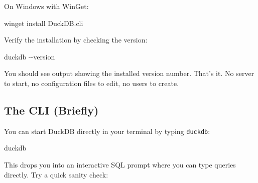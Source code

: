 \documentclass[
  letterpaper,
  DIV=11,
  numbers=noendperiod]{scrreprt}
\newenvironment{Shaded}{\begin{snugshade}}{\end{snugshade}}
\newcommand{\AttributeTok}[1]{\textcolor[rgb]{0.40,0.45,0.13}{#1}}
\newcommand{\ExtensionTok}[1]{\textcolor[rgb]{0.00,0.23,0.31}{#1}}
\newcommand{\NormalTok}[1]{\textcolor[rgb]{0.00,0.23,0.31}{#1}}
\begin{document}
On Windows with WinGet:

\begin{codelisting}

\caption{\texttt{terminal}}

\begin{Shaded}
\begin{Highlighting}[]
\ExtensionTok{winget}\NormalTok{ install DuckDB.cli}
\end{Highlighting}
\end{Shaded}

\end{codelisting}

Verify the installation by checking the version:

\begin{codelisting}

\caption{\texttt{terminal}}

\begin{Shaded}
\begin{Highlighting}[]
\ExtensionTok{duckdb} \AttributeTok{{-}{-}version}
\end{Highlighting}
\end{Shaded}

\end{codelisting}

You should see output showing the installed version number. That's it.
No server to start, no configuration files to edit, no users to create.

\subsection{The CLI (Briefly)}\label{the-cli-briefly}

You can start DuckDB directly in your terminal by typing
\texttt{duckdb}:

\begin{codelisting}

\caption{\texttt{terminal}}

\begin{Shaded}
\begin{Highlighting}[]
\ExtensionTok{duckdb}
\end{Highlighting}
\end{Shaded}

\end{codelisting}

This drops you into an interactive SQL prompt where you can type queries
directly. Try a quick sanity check:
\end{document}
